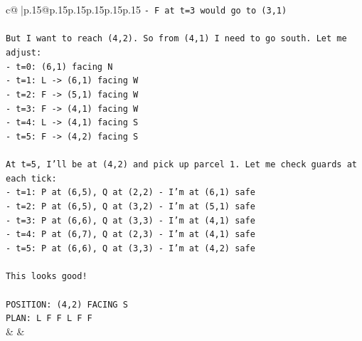 \documentclass{article}
\begin{document}
{\begin{supertabular}{c@{$\;$}|p{.15\linewidth}@{}p{.15\linewidth}p{.15\linewidth}p{.15\linewidth}p{.15\linewidth}p{.15\linewidth}}
{{{\texttt{{-} F at t=3 would go to (3,1)} \\
\\ 
\texttt{But I want to reach (4,2). So from (4,1) I need to go south. Let me adjust:} \\
\texttt{{-} t=0: (6,1) facing N} \\
\texttt{{-} t=1: L {-}> (6,1) facing W} \\
\texttt{{-} t=2: F {-}> (5,1) facing W} \\
\texttt{{-} t=3: F {-}> (4,1) facing W} \\
\texttt{{-} t=4: L {-}> (4,1) facing S} \\
\texttt{{-} t=5: F {-}> (4,2) facing S} \\
\\ 
\texttt{At t=5, I'll be at (4,2) and pick up parcel 1. Let me check guards at each tick:} \\
\texttt{{-} t=1: P at (6,5), Q at (2,2) {-} I'm at (6,1) safe} \\
\texttt{{-} t=2: P at (6,5), Q at (3,2) {-} I'm at (5,1) safe} \\
\texttt{{-} t=3: P at (6,6), Q at (3,3) {-} I'm at (4,1) safe} \\
\texttt{{-} t=4: P at (6,7), Q at (2,3) {-} I'm at (4,1) safe} \\
\texttt{{-} t=5: P at (6,6), Q at (3,3) {-} I'm at (4,2) safe} \\
\\ 
\texttt{This looks good!} \\
\\ 
\texttt{POSITION: (4,2) FACING S} \\
\texttt{PLAN: L F F L F F} \\
            }
        }
    }
    & & \\ \\


\end{supertabular}}
\end{document}
